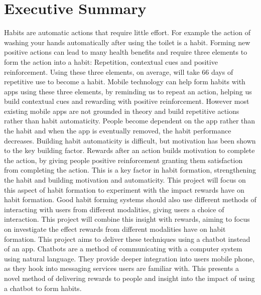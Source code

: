 \section*{Executive Summary}

Habits are automatic actions that require little effort. For example the action of washing your hands automatically after using the toilet is a habit. Forming new positive actions can lead to many health benefits and require three elements to form the action into a habit: Repetition, contextual cues and positive reinforcement. Using these three elements, on average, will take 66 days of repetitive use to become a habit.\newline
\newline
Mobile technology can help form habits with apps using these three elements, by reminding us to repeat an action, helping us build contextual cues and rewarding with positive reinforcement. However most existing mobile apps are not grounded in theory and build repetitive actions rather than habit automaticity. People become dependent on the app rather than the habit and when the app is eventually removed, the habit performance decreases. Building habit automaticity is difficult, but motivation has been shown to the key building factor. Rewards after an action builds motivation to complete the action, by giving people positive reinforcement granting them satisfaction from completing the action. This is a key factor in habit formation, strengthening the habit and building motivation and automaticity. This project will focus on this aspect of habit formation to experiment with the impact rewards have on habit formation.\newline
\newline
Good habit forming systems should also use different methods of interacting with users from different modalities, giving users a choice of interaction. This project will combine this insight with rewards, aiming to focus on investigate the effect rewards from different modalities have on habit formation.\newline
\newline
This project aims to deliver these techniques using a chatbot instead of an app. Chatbots are a method of communicating with a computer system using natural language. They provide deeper integration into users mobile phone, as they hook into messaging services users are familiar with. This presents a novel method of delivering rewards to people and insight into the impact of using a chatbot to form habits.\newline
